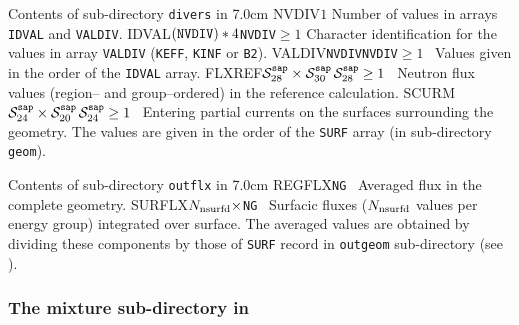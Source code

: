 \begin{DescriptionEnregistrement}{Contents of sub-directory {\tt divers} in }{7.0cm}
\IntEnr
  {NVDIV}{$1$}
  {Number of values in arrays {\tt IDVAL} and {\tt VALDIV}.}
\OptCharEnr
  {IDVAL}{$({\tt NVDIV})*4$}{{\tt NVDIV}$\ge 1$}
  {Character identification for the values in array {\tt VALDIV} ({\tt KEFF}, {\tt KINF} or {\tt B2}).}
\OptRealEnr
  {VALDIV}{{\tt NVDIV}}{{\tt NVDIV}$\ge 1$}{~}
  {Values given in the order of the {\tt IDVAL} array.}
\OptRealEnr
  {FLXREF}{$\mathcal{S}^{\tt sap}_{28}\times \mathcal{S}^{\tt sap}_{30}$}{$\mathcal{S}^{\tt sap}_{28}\ge 1$}{~}
  {Neutron flux values (region-- and group--ordered) in the reference calculation.}
\OptRealEnr
  {SCURM}{$\mathcal{S}^{\tt sap}_{24}\times \mathcal{S}^{\tt sap}_{20}$}{$\mathcal{S}^{\tt sap}_{24}\ge 1$}{~}
  {Entering partial currents on the surfaces surrounding the geometry. The values are given in the order of
  the {\tt SURF} array (in sub-directory {\tt geom}).}
\end{DescriptionEnregistrement}

\vskip -0.5cm
\clearpage

\begin{DescriptionEnregistrement}{Contents of sub-directory {\tt outflx} in }{7.0cm}
\RealEnr
  {REGFLX}{{\tt NG}}{~}
  {Averaged flux in the complete geometry.}
\RealEnr
  {SURFLX}{$N_{\rm nsurfd}\times${\tt NG}}{~}
  {Surfacic fluxes ($N_{\rm nsurfd}$ values per energy group) integrated over surface. The averaged values are obtained by dividing these
  components by those of {\tt SURF} record in {\tt outgeom} sub-directory (see ).}
\end{DescriptionEnregistrement}

\subsubsection{The mixture sub-directory  in }\label{sect:sapdirmix}

\vskip -0.5cm

